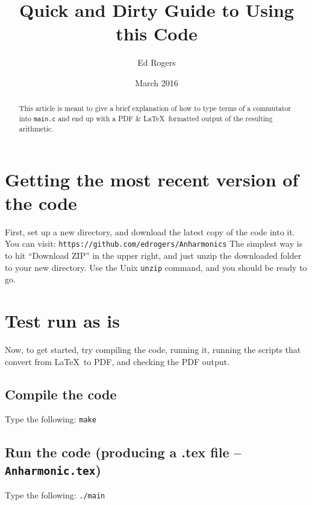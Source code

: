 \documentclass{article}
\title{Quick and Dirty Guide to Using this Code}
\author{Ed Rogers}
\date{March 2016}
\begin{document}
   \maketitle

\begin{abstract}
This article is meant to give a brief explanation of how to type terms of a commutator into \texttt{main.c} and end up with a PDF \& \LaTeX\ formatted output of the resulting arithmetic.
\end{abstract}

\section{Getting the most recent version of the code}

First, set up a new directory, and download the latest copy of the code into it. You can visit:
\newline
\newline
\texttt{https://github.com/edrogers/Anharmonics}
\newline
\newline
The simplest way is to hit ``Download ZIP'' in the upper right, and just unzip the downloaded folder to your new directory. Use the Unix \texttt{unzip} command, and you should be ready to go.

\section{Test run as is}

Now, to get started, try compiling the code, running it, running the scripts that convert from \LaTeX\ to PDF, and checking the PDF output.

\subsection{Compile the code}

Type the following: 
\newline
\newline
\texttt{make}
\newline
\newline

\subsection{Run the code (producing a .tex file -- \texttt{Anharmonic.tex})}

Type the following: 
\newline
\newline
\texttt{./main}
\newline
\newline
\end{document}
